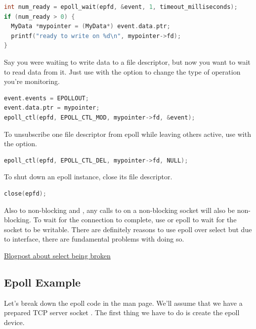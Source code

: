 \begin{lstlisting}[language=C]
int num_ready = epoll_wait(epfd, &event, 1, timeout_milliseconds);
if (num_ready > 0) {
  MyData *mypointer = (MyData*) event.data.ptr;
  printf("ready to write on %d\n", mypointer->fd);
}
\end{lstlisting}

Say you were waiting to write data to a file descriptor, but now you want to wait to read data from it.
Just use  with the  option to change the type of operation you're monitoring.

\begin{lstlisting}[language=C]
event.events = EPOLLOUT;
event.data.ptr = mypointer;
epoll_ctl(epfd, EPOLL_CTL_MOD, mypointer->fd, &event);
\end{lstlisting}

To unsubscribe one file descriptor from epoll while leaving others active, use  with the  option.

\begin{lstlisting}[language=C]
epoll_ctl(epfd, EPOLL_CTL_DEL, mypointer->fd, NULL);
\end{lstlisting}

To shut down an epoll instance, close its file descriptor.

\begin{lstlisting}[language=C]
close(epfd);
\end{lstlisting}

Also to non-blocking  and , any calls to  on a non-blocking socket will also be non-blocking.
To wait for the connection to complete, use  or epoll to wait for the socket to be writable.
There are definitely reasons to use epoll over select but due to interface, there are fundamental problems with doing so.

\href{https://idea.popcount.org/2017-01-06-select-is-fundamentally-broken/}{Blogpost about select being broken}

\subsection{Epoll Example}

Let's break down the epoll code in the man page.
We'll assume that we have a prepared TCP server socket .
The first thing we have to do is create the epoll device.

